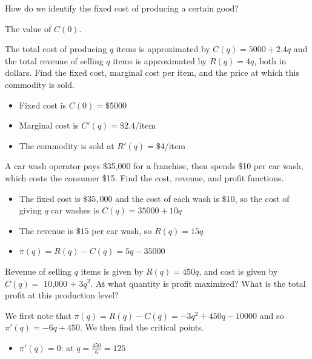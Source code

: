 \documentclass[11pt]{exam}
\begin{document}
\noindent
How do we identify the fixed cost of producing a certain good?
\begin{solution}
  The value of \(C(0)\).
\end{solution}
\vspace{3em}
\begin{questions}
  \question The total cost of producing \(q\) items is approximated by
    $C(q) = 5000+2.4q$ and the total revenue of selling \(q\) items is
    approximated by $R(q) = 4q$, both in dollars.  Find the fixed
    cost, marginal cost per item, and the price at which this
    commodity is sold. 
    \begin{solution}
      \begin{itemize}
      \item Fixed cost is \(C(0) = \$5000\)
      \item Marginal cost is \(C'(q) = \$2.4\)/item
      \item The commodity is sold at \(R'(q) = \$4\)/item
      \end{itemize}
    \end{solution}
    \vspace{.7in}
  \question A car wash operator pays \$35,000 for a franchise, then spends \$10 per car wash, which costs the consumer \$15.  Find the cost, revenue, and profit functions.
    \begin{solution}
      \begin{itemize}
      \item The fixed cost is \(\$35,000\) and the cost of each wash is
      \(\$10\), so the cost of giving \(q\) car washes is \(C(q) = 35000+10q\)
      \item The revenue is \(\$15\) per car wash, so \(R(q) = 15q\)
      \item \(\pi(q) = R(q)-C(q) = 5q-35000\)
      \end{itemize}
    \end{solution}
    \vspace{.7in}
  \question Revenue of selling \(q\) items is given by $R(q)=450q$, and cost is given by $C(q)=$ 10,000 $ +\; 3q^2$.  At what quantity is profit maximized?  What is the total profit at this production level?
    \begin{solution}
      We first note that \(\pi(q) = R(q)-C(q) = -3q^2+450q-10000\) and
      so \(\pi'(q) = -6q+450\). We then find the critical points.
      \begin{itemize}
      \item \(\pi'(q) = 0\): at \(q = \frac{450}{6} = 125\)

\end{itemize}
\end{solution}
\end{questions}
\end{document}
